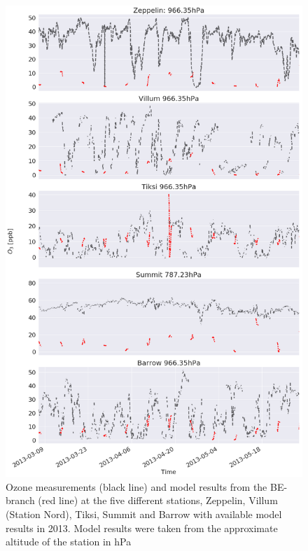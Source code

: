 \begin{figure}[h]
    \centering
    \includegraphics[width = \linewidth]{Chapter6_Results/images/ozone_stationComp_2013/ozone_2013.png}
    \caption{Ozone measurements (black line) and model results from the BE-branch (red line) at the five different stations, Zeppelin, Villum (Station Nord), Tiksi, Summit and Barrow with available model results in 2013. Model results were taken from the approximate altitude of the station in hPa}
    \label{fig:ozone_2013}
\end{figure}